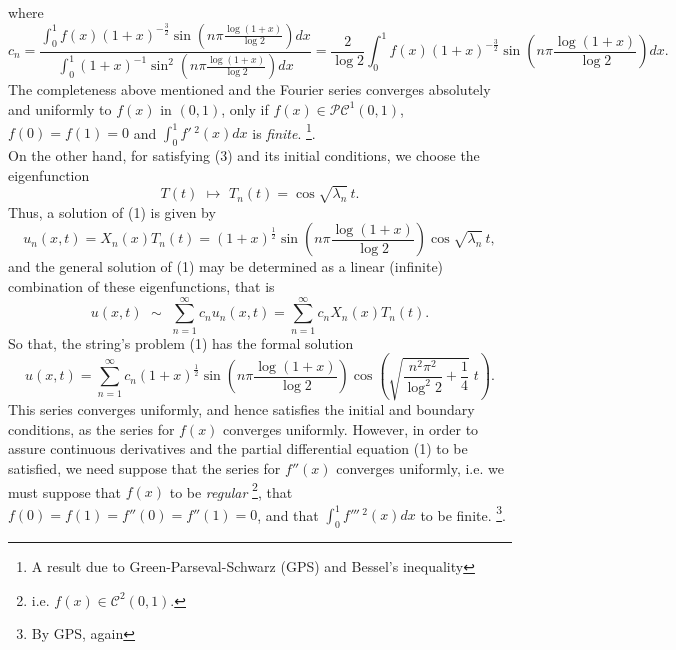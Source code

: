 \documentclass[12pt]{article}
\begin{document}
where
\begin{equation*}
c_n=\frac{\int_0^1 f(x)(1+x)^{-\frac{3}{2}}\sin\left(n\pi\frac{\log(1+x)}{\log 2}\right)dx}
{\int_0^1 (1+x)^{-1}\sin^2\left(n\pi\frac{\log(1+x)}{\log 2}\right)dx}=
\frac{2}{\log 2}\int_0^1 f(x)(1+x)^{-\frac{3}{2}}\sin\left(n\pi\frac{\log(1+x)}{\log 2}\right)dx. 
\end{equation*}
The completeness above mentioned and the Fourier series converges absolutely and uniformly to $f(x)$ in $(0,1)$, only if $f(x)\in\mathcal{PC}^1(0,1)$, $f(0)=f(1)=0$ and $\int_0^1 f'\,^2(x) dx$ is \emph{finite}. {\footnote{A result due to Green-Parseval-Schwarz (GPS) and Bessel's inequality}.} \\
On the other hand, for satisfying (3) and its initial conditions, we choose the eigenfunction 
\begin{equation*}
T(t)\,\, \mapsto \,\, T_n(t)=\cos\sqrt{\lambda_n}\,t.
\end{equation*}
Thus, a solution of (1) is given by
\begin{equation*}
u_n(x,t)=X_n(x)T_n(t)=
(1+x)^{\frac{1}{2}}\sin\left(n\pi\frac{\log(1+x)}{\log 2}\right)\cos\sqrt{\lambda_n}\,t,
\end{equation*}
and the general solution of (1) may be determined as a linear (infinite) combination of these eigenfunctions, that is
\begin{equation*}
u(x,t)\,\, \sim\,\, \sum_{n=1}^{\infty}c_n u_n(x,t)=\sum_{n=1}^{\infty}c_n X_n(x)T_n(t).
\end{equation*}
So that, the string's problem (1) has the formal solution
\begin{equation}
u(x,t)=\sum_{n=1}^{\infty}c_n (1+x)^{\frac{1}{2}}\sin\left(n\pi\frac{\log(1+x)}{\log 2}\right)
\cos\left(\sqrt{\frac{n^2\pi^2}{\log^2 2}+\frac{1}{4}}\;t\right).
\end{equation}
This series converges uniformly, and hence satisfies the initial and boundary conditions, as the series for $f(x)$ converges uniformly. However, in order to assure continuous derivatives and the partial differential equation (1) to be satisfied, we need suppose that the series for $f''(x)$ converges uniformly, i.e. we must suppose that $f(x)$ to be \emph{regular} {\footnote{i.e. $f(x)\in \mathcal{C}^2(0,1)$.}}, that $f(0)=f(1)=f''(0)=f''(1)=0$, and that $\int_0^1 f'''\,^2(x) dx$ to be finite. {\footnote{By GPS, again}.}




 
 
\end{document}
